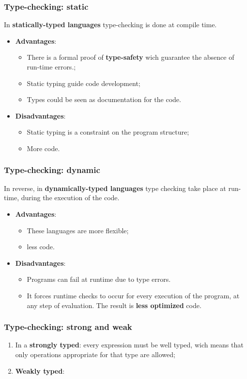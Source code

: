 \documentclass[xcolor ={table,usenames,dvipsnames}]{beamer}
\theoremstyle{definition}
\begin{document}
	\begin{frame}
		\frametitle{Type-checking: static  }
		In \textbf{statically-typed languages} type-checking is done at compile time.
		\begin{itemize}
			\item \textbf{Advantages}:\begin{itemize}
				\item There is a formal proof of \textbf{type-safety} wich guarantee the absence of run-time errors.;
				\item Static typing guide code development;
				\item Types could be seen as documentation for the code.
			\end{itemize}
			\item \textbf{Disadvantages}: 
			\begin{itemize}
				\item Static typing is a constraint on the program structure;
				\item More code.
			\end{itemize}
		\end{itemize}
	\end{frame}

\begin{frame}
	\frametitle{Type-checking: dynamic}
	In reverse, in \textbf{dynamically-typed languages}
	type checking take place at run-time, during the execution of the code.
	\begin{itemize}
		\item \textbf{Advantages}:
		\begin{itemize}
			\item These languages are more flexible;
			\item less code.
		\end{itemize}
		\item \textbf{Disadvantages}:
		\begin{itemize}
			\item Programs can fail at runtime due to type errors.
			\item It forces runtime checks to occur for every execution of the program, at any step of evaluation. The result is \textbf{less optimized} code.
		\end{itemize}
	\end{itemize}
 \end{frame}

\begin{frame}
	\frametitle{Type-checking: strong and weak}
	\begin{enumerate}
		\item In a \textbf{strongly typed}: every expression must be well typed, wich means that only operations appropriate for that type are allowed;
		\item \textbf{Weakly typed}:
	\end{enumerate}
	
\end{frame}
\end{document}
